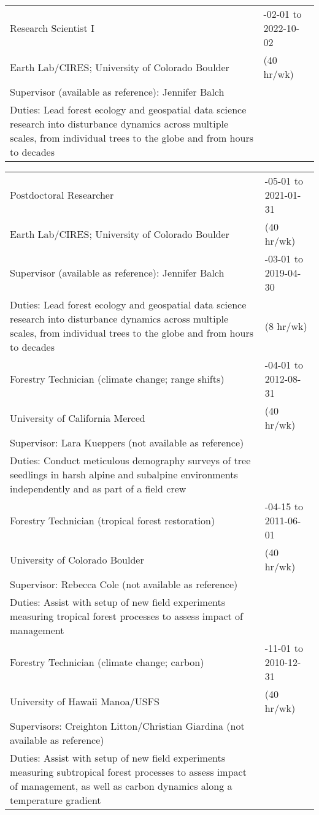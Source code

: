 \documentclass[10pt,english]{article}
\providecommand{\tabularnewline}{\\}
\begin{document}
\begin{tabularx}{\textwidth}{@{}>{\raggedright}p{4.5in} >{\raggedleft}X@{}}
Research Scientist I & 2021-02-01 to 2022-10-02 \tabularnewline
\addtolength{\leftskip}{5ex}Earth Lab/CIRES; University of Colorado Boulder & (40 hr/wk) \tabularnewline
\addtolength{\leftskip}{5ex}Supervisor (available as reference): Jennifer Balch & \tabularnewline
\addtolength{\leftskip}{5ex}Duties: Lead forest ecology and geospatial data science research into disturbance dynamics across multiple scales, from individual trees to the globe and from hours to decades  & \tabularnewline

\end{tabularx}

\renewcommand{\arraystretch}{1.2}
\begin{tabularx}{\textwidth}{@{}>{\raggedright}p{4.5in} >{\raggedleft}X@{}}

Postdoctoral Researcher & 2019-05-01 to 2021-01-31 \tabularnewline
\addtolength{\leftskip}{5ex}Earth Lab/CIRES; University of Colorado Boulder & (40 hr/wk) \tabularnewline
\addtolength{\leftskip}{5ex}Supervisor (available as reference): Jennifer Balch & 2019-03-01 to 2019-04-30 \tabularnewline
\addtolength{\leftskip}{5ex}Duties: Lead forest ecology and geospatial data science research into disturbance dynamics across multiple scales, from individual trees to the globe and from hours to decades & (8 hr/wk) \tabularnewline

Forestry Technician (climate change; range shifts) & 2012-04-01 to 2012-08-31 \tabularnewline
\addtolength{\leftskip}{5ex}University of California Merced & (40 hr/wk) \tabularnewline
\addtolength{\leftskip}{5ex}Supervisor: Lara Kueppers (not available as reference) & \tabularnewline
\addtolength{\leftskip}{5ex}Duties: Conduct meticulous demography surveys of tree seedlings in harsh alpine and subalpine environments independently and as part of a field crew  & \tabularnewline

Forestry Technician (tropical forest restoration) & 2011-04-15 to 2011-06-01 \tabularnewline
\addtolength{\leftskip}{5ex} University of Colorado Boulder & (40 hr/wk) \tabularnewline
\addtolength{\leftskip}{5ex}Supervisor: Rebecca Cole (not available as reference) & \tabularnewline
\addtolength{\leftskip}{5ex}Duties: Assist with setup of new field experiments measuring tropical forest processes to assess impact of management & \tabularnewline

Forestry Technician (climate change; carbon) & 2009-11-01 to 2010-12-31 \tabularnewline
\addtolength{\leftskip}{5ex} University of Hawaii Manoa/USFS & (40 hr/wk) \tabularnewline
\addtolength{\leftskip}{5ex}Supervisors: Creighton Litton/Christian Giardina (not available as reference) & \tabularnewline
\addtolength{\leftskip}{5ex}Duties: Assist with setup of new field experiments measuring subtropical forest processes to assess impact of management, as well as carbon dynamics along a temperature gradient & \tabularnewline


\end{tabularx}
\end{document}

